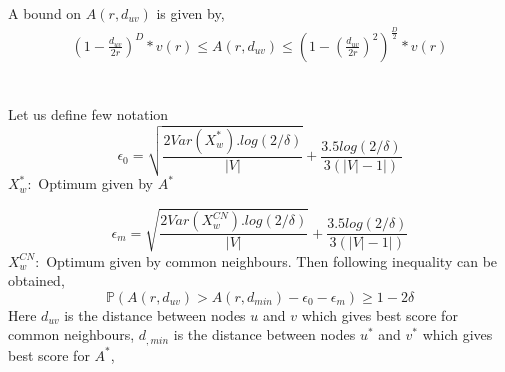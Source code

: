 \documentclass{article}
\begin{document}
A bound on $A(r,d_{uv})$ is given by, 
\begin{equation} \label{eq7}
\begin{split}
\left (1-\frac{d_{uv}}{2r}\right)^D*v(r)\leq A(r,d_{uv})\leq \left(1-\left(\frac{d_{uv}}{2r}\right)^2\right)^\frac{D}{2}*v(r)
\end{split}
\end{equation}\\~\\

Let us define few notation 
\begin{equation}
\epsilon_0 =\sqrt{\frac{2Var(X_w^*).log(2/\delta)}{|V|}}+\frac{3.5log(2/\delta)}{3(|V|-1|)}
\end{equation}
$X_w^*:$ Optimum given by $A^*$

\begin{equation}
\epsilon_m =\sqrt{\frac{2Var(X_w^{CN}).log(2/\delta)}{|V|}}+\frac{3.5log(2/\delta)}{3(|V|-1|)}
\end{equation}
$X_w^{CN}:$ Optimum given by common neighbours.
Then following inequality can be obtained,
\begin{equation}
\mathbb{P}(A(r,d_{uv})>A(r,d_{min})-\epsilon_0-\epsilon_m)\geq 1-2\delta
\end{equation}
Here $d_{uv}$ is the distance between nodes $u$ and $v$ which gives best score for common neighbours, $d_{,min}$ is the distance between nodes $u^*$ and $v^*$ which gives best score for $A^*$, 
\end{document}
